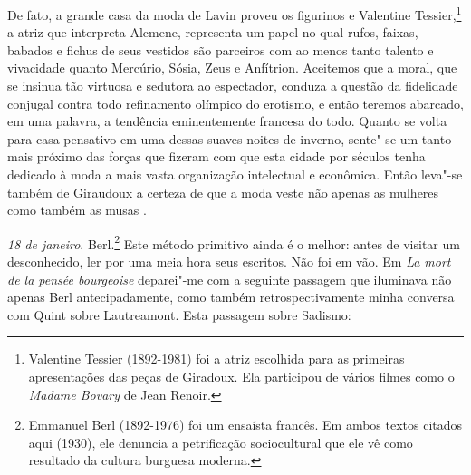 De fato, a grande casa da moda de Lavin proveu os figurinos e Valentine
Tessier,\footnote{Valentine Tessier (1892-1981) foi a atriz
  escolhida para as primeiras apresentações das peças de Giradoux. Ela
  participou de vários filmes como o \emph{Madame Bovary} de Jean
  Renoir. \versal{[N. E.]}} a atriz que interpreta Alcmene, representa um papel no qual
rufos, faixas, babados e fichus de seus vestidos são parceiros com ao
menos tanto talento e vivacidade quanto Mercúrio, Sósia, Zeus e
Anfítrion. Aceitemos que a moral, que se insinua tão virtuosa e sedutora
ao espectador, conduza a questão da fidelidade conjugal contra todo
refinamento olímpico do erotismo, e então teremos abarcado, em uma
palavra, a tendência eminentemente francesa do todo. Quanto se volta
para casa pensativo em uma dessas suaves noites de inverno, sente"-se um
tanto mais próximo das forças que fizeram com que esta cidade por
séculos tenha dedicado à moda a mais vasta organização intelectual e
econômica. Então leva"-se também de Giraudoux a certeza de que a moda
veste não apenas as mulheres como também as musas .

\emph{18 de janeiro}. Berl.\footnote{Emmanuel Berl (1892-1976) foi um
  ensaísta francês. Em ambos textos citados aqui (1930), ele denuncia a
  petrificação sociocultural que ele vê como resultado da cultura
  burguesa moderna. \versal{[N. E.]}} Este método primitivo ainda é o melhor: antes de
visitar um desconhecido, ler por uma meia hora seus escritos. Não foi em
vão. Em \emph{La mort de la pensée bourgeoise} deparei"-me com a seguinte
passagem que iluminava não apenas Berl antecipadamente, como também
retrospectivamente minha conversa com Quint sobre Lautreamont. Esta
passagem sobre Sadismo:

